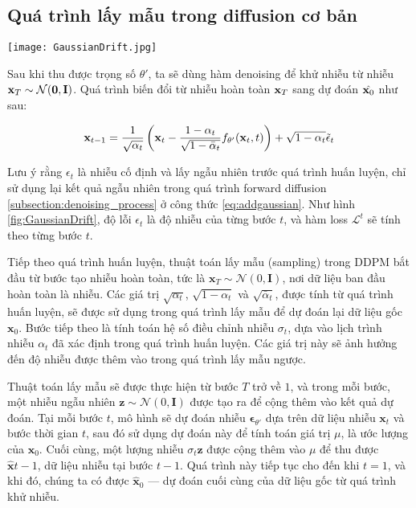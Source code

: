 	
\subsection{Quá trình lấy mẫu trong diffusion cơ bản}
	
		\begin{figure*}
		\centering
		\texttt{[image: GaussianDrift.jpg]}
		\caption{Quá trình Training và Sampling trong mô hình Diffusion tiêu chuẩn}
		\label{fig:GaussianDrift}
	\end{figure*}
	

	Sau khi thu được trọng số $\theta'$, ta sẽ dùng hàm denoising để khử nhiễu từ nhiễu $\mathbf{x}_T \sim \mathcal{N} (\mathbf{0}, \mathbf{I})$.
	Quá trình biến đổi từ nhiễu hoàn toàn $\mathbf{x}_{T}$ sang dự đoán $\hat{\mathbf{x}_0}$ như sau:
	
	\begin{equation}
		\label{eq:adddenoising}
	\mathbf{x}_{t-1} = \frac{1}{\sqrt{\alpha_t}} \left( \mathbf{x}_t - \frac{1- \alpha_t}{\sqrt{1 - \bar{\alpha}_t}} f_{\theta'}(\mathbf{x}_t, t) \right) + \sqrt{1 - \alpha_t} \tilde{\epsilon}_t
	\end{equation}
	
Lưu ý rằng $\epsilon_t$ là nhiễu cố định và lấy ngẫu nhiên trước quá trình huấn luyện, chỉ sử dụng lại kết quả ngẫu nhiên trong quá trình forward diffusion \ref{subsection:denoising_process} ở công thức  \ref{eq:addgaussian}. Như hình \ref{fig:GaussianDrift}, độ lỗi $\epsilon_t$ là độ nhiễu của từng bước $t$, và hàm loss  $\mathcal{L}^{t}$ sẽ tính theo từng bước $t$.


Tiếp theo quá trình huấn luyện, thuật toán lấy mẫu (sampling) trong DDPM bắt đầu từ bước tạo nhiễu hoàn toàn, tức là $\mathbf{x}_T \sim \mathcal{N}(0, \mathbf{I})$, nơi dữ liệu ban đầu hoàn toàn là nhiễu. Các giá trị $\sqrt{\alpha_t}$, $\sqrt{1 - \alpha_t}$ và $\sqrt{\bar{\alpha}_t}$, được tính từ quá trình huấn luyện, sẽ được sử dụng trong quá trình lấy mẫu để dự đoán lại dữ liệu gốc $\mathbf{x}_0$. Bước tiếp theo là tính toán hệ số điều chỉnh nhiễu $\sigma_t$, dựa vào lịch trình nhiễu $\alpha_t$ đã xác định trong quá trình huấn luyện. Các giá trị này sẽ ảnh hưởng đến độ nhiễu được thêm vào trong quá trình lấy mẫu ngược.

Thuật toán lấy mẫu sẽ được thực hiện từ bước $T$ trở về $1$, và trong mỗi bước, một nhiễu ngẫu nhiên $\mathbf{z} \sim \mathcal{N}(0, \mathbf{I})$ được tạo ra để cộng thêm vào kết quả dự đoán. Tại mỗi bước $t$, mô hình sẽ dự đoán nhiễu $\boldsymbol{\epsilon}_{\theta'}$ dựa trên dữ liệu nhiễu $\mathbf{x}_t$ và bước thời gian $t$, sau đó sử dụng dự đoán này để tính toán giá trị $\mu$, là ước lượng của $\mathbf{x}_0$. Cuối cùng, một lượng nhiễu $\sigma_t \mathbf{z}$ được cộng thêm vào $\mu$ để thu được $\hat{\mathbf{x}}{t-1}$, dữ liệu nhiễu tại bước $t-1$. Quá trình này tiếp tục cho đến khi $t = 1$, và khi đó, chúng ta có được $\hat{\mathbf{x}}_0$ — dự đoán cuối cùng của dữ liệu gốc từ quá trình khử nhiễu.

